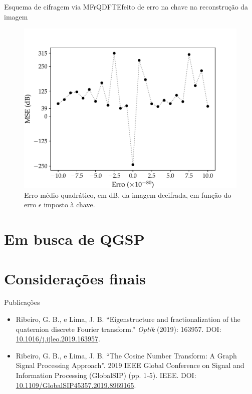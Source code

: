 \documentclass[10pt,compress]{beamer}
\newcommand{\colorlink}[1]{{\color{paleblue}#1}}
\begin{document}
\begin{frame}{Esquema de cifragem via MFrQDFT}{Efeito de erro na chave na reconstru\c c\~ao da imagem}
\begin{figure}
\centering
\includegraphics[width=0.7\linewidth]{Figures/MSEdb_FrQDFT_PT.pdf}
\caption{Erro m\'edio quadr\'atico, em dB, da imagem decifrada, em fun\c c\~ao do erro $ \epsilon $ imposto \`a chave.}
\label{fig:MSE}
\end{figure}
\end{frame}

\section[QGSP]{Em busca de QGSP}\label{sec:gfnt}


\section{Considera\c c\~oes finais}\label{sec:conc}

\begin{frame}{Publica\c c\~oes}
\begin{itemize}
\item Ribeiro, G. B., e Lima, J. B. ``Eigenstructure and fractionalization of the quaternion discrete Fourier transform.'' \emph{Optik} (2019): 163957. DOI: \colorlink{\href{https://doi.org/10.1016/j.ijleo.2019.163957}{10.1016/j.ijleo.2019.163957}}.

\item Ribeiro, G. B., e Lima, J. B. ``The Cosine Number Transform: A Graph Signal Processing Approach''. 2019 IEEE Global Conference on Signal and Information Processing (GlobalSIP) (pp. 1-5). IEEE. DOI: \colorlink{\href{https://doi.org/10.1109/GlobalSIP45357.2019.8969165}{10.1109/GlobalSIP45357.2019.8969165}}.
\end{itemize}
\end{frame}

%
% 
%

\end{document}

